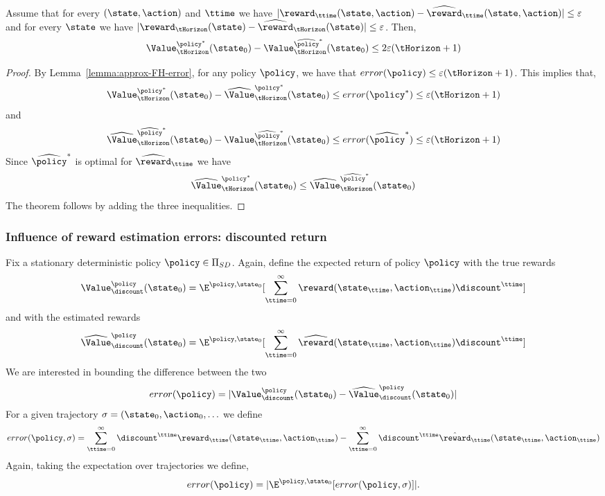 \begin{theorem}
Assume that for every $(\state,\action)$ and $\ttime$ we have
$|\reward_\ttime(\state,\action)-\widehat{\reward}_\ttime(\state,\action)|\leq
\varepsilon$ and for every $\state$ we have
$|\reward_\tHorizon(\state)-\widehat{\reward}_\tHorizon(\state)|\leq\varepsilon$.
Then,
\[
\Value^{\policy^*}_\tHorizon(\state_0) -
\Value^{\widehat{\policy}^*}_\tHorizon (\state_0) \leq
2\varepsilon(\tHorizon+1)
\]
\end{theorem}

\begin{proof}
By Lemma~\ref{lemma:approx-FH-error},  for any policy $\policy$, we
have that $error(\policy)\leq \varepsilon(\tHorizon+1)$. This
implies that,
\[
\Value^{\policy^*}_\tHorizon(\state_0)-
\widehat{\Value}^{\policy^*}_\tHorizon(\state_0)\leq
error(\policy^*)\leq \varepsilon(\tHorizon+1)
\]
and
\[
\widehat{\Value}^{\widehat{\policy}^*}_\tHorizon(\state_0)-
\Value^{\widehat{\policy}^*}_\tHorizon(\state_0)\leq
error(\widehat{\policy}^*)\leq \varepsilon(\tHorizon+1)
\]
Since $\widehat{\policy}^*$ is optimal for
$\widehat{\reward}_\ttime$ we have
\[
\widehat{\Value}^{\policy^*}_\tHorizon(\state_0)\leq
\widehat{\Value}^{\widehat{\policy}^*}_\tHorizon(\state_0)
\]
The theorem follows by adding the three inequalities.
\end{proof}


\subsubsection{Influence of reward estimation errors: discounted return}

Fix a stationary deterministic policy $\policy\in {\Pi _{SD}}$.
Again, define the expected return of policy $\policy$ with the true
rewards
\[
\Value^\policy_\discount(\state_0)=\E^{\policy,\state_0}[\sum_{\ttime=0}^\infty
\reward(\state_\ttime,\action_\ttime)\discount^\ttime]
\]
and with the estimated rewards
\[
\widehat{\Value}^\policy_\discount(\state_0)=\E^{\policy,\state_0}[\sum_{\ttime=0}^\infty
\widehat{\reward}(\state_\ttime,\action_\ttime)\discount^\ttime ]
\]
We are interested in bounding the difference between the two
\[
error(\policy)=|\Value^\policy_\discount(\state_0)-\widehat{\Value}^\policy_\discount(\state_0)|
\]
For a given trajectory
$\sigma=(\state_0,\action_0,\ldots$
we define
\[
error(\policy,\sigma)= \sum_{\ttime=0}^\infty \discount^\ttime
\reward_\ttime(\state_\ttime,\action_\ttime)- \sum_{\ttime=0}^\infty
\discount^\ttime \hat{\reward}_\ttime(\state_\ttime,\action_\ttime)
\]
Again, taking the expectation over trajectories we define,
\[
error(\policy)=|\E^{\policy,\state_0} [error(\policy,\sigma)]|.
\]

